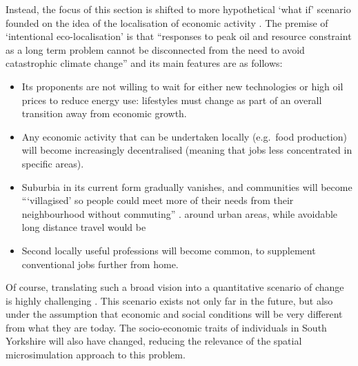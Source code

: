 Instead, the focus of this section is shifted to more hypothetical `what if' scenario
founded on the idea of the localisation of economic activity \citep{North2010585}.
The
premise of `intentional eco-localisation' is that ``responses to peak oil and resource
constraint as a long term problem cannot be disconnected from the
need to avoid catastrophic climate change'' \citep[p.~585]{North2010585} and its main
features are as follows:
\begin{itemize}
 \item Its proponents are not willing to wait for either new technologies or
 high oil prices to reduce energy use: lifestyles must change as part of an
 overall transition away from economic growth.
 \item Any economic activity that can be undertaken locally (e.g.~food production)
 will become increasingly
 decentralised (meaning that jobs less concentrated in specific areas).
 \item Suburbia in its current form gradually vanishes, and communities
 will become ```villagised' so people could meet more of their needs from their
neighbourhood without commuting'' \citep[p.~591]{North2010585}.
around urban areas, while avoidable long distance travel would be
 \item Second locally useful professions will become common,
 to supplement conventional jobs further from home.
\end{itemize}
Of course, translating such a broad vision into a quantitative scenario
of change is highly challenging \citep{Winther2013}. This scenario
exists not only far in the future, but also under the assumption that
economic and social conditions will be very different from what they are today.
The socio-economic traits of individuals in South Yorkshire will also have
changed, reducing the relevance of the spatial microsimulation approach to this
problem.

